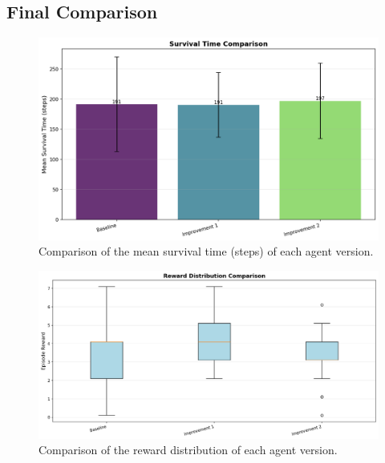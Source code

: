 \documentclass[twocolumn]{article}
\begin{document}
\subsection*{Final Comparison}
\begin{figure}[H]
	\centering
	\includegraphics[width=0.8\linewidth]{images/DQNImprov2survival_comparison.png}
	\caption{Comparison of the mean survival time (steps) of each agent version.}
	\label{fig:dqn_comp_survival}
\end{figure}
\newpage
\begin{figure}[H]
	\centering
	\includegraphics[width=0.8\linewidth]{images/DQNImprov2reward_comparison.png}
	\caption{Comparison of the reward distribution of each agent version.}
	\label{fig:dqn_comp_reward}
\end{figure}
\end{document}
